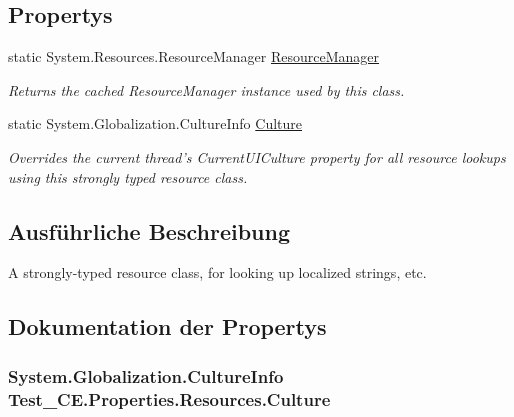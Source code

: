 \subsection*{Propertys}
\begin{DoxyCompactItemize}
\item 
static System.Resources.ResourceManager \hyperlink{class_test___c_e_1_1_properties_1_1_resources_a34fefe776becc85e7ae843785ef10db7}{ResourceManager}
\begin{DoxyCompactList}\small\item\em Returns the cached ResourceManager instance used by this class. \item\end{DoxyCompactList}\item 
static System.Globalization.CultureInfo \hyperlink{class_test___c_e_1_1_properties_1_1_resources_a1721d23c918508899f46aaf22048fefd}{Culture}
\begin{DoxyCompactList}\small\item\em Overrides the current thread's CurrentUICulture property for all resource lookups using this strongly typed resource class. \item\end{DoxyCompactList}\end{DoxyCompactItemize}


\subsection{Ausführliche Beschreibung}
A strongly-\/typed resource class, for looking up localized strings, etc. 

\subsection{Dokumentation der Propertys}
\hypertarget{class_test___c_e_1_1_properties_1_1_resources_a1721d23c918508899f46aaf22048fefd}{
\subsubsection[{Culture}]{\setlength{\rightskip}{0pt plus 5cm}System.Globalization.CultureInfo Test\_\-CE.Properties.Resources.Culture}}
\label{class_test___c_e_1_1_properties_1_1_resources_a1721d23c918508899f46aaf22048fefd}


